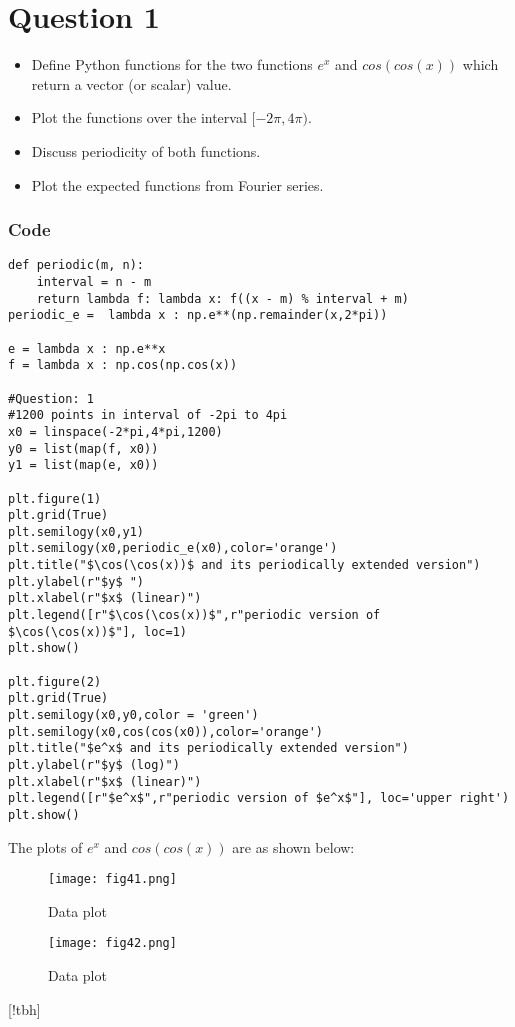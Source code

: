 \documentclass[11pt, a4paper, twoside]{article}
\begin{document}
\section{Question 1}
\begin{itemize}[label=-]
\item Define Python functions for the two functions $e^x$ and $cos(cos(x))$ which return a vector (or scalar) value.
\item Plot the functions over the interval $[-2\pi,4\pi)$.
\item Discuss periodicity of both functions.
\item Plot the expected functions from Fourier series.
\end{itemize}
\subsubsection{Code}
\begin{verbatim}
def periodic(m, n):
    interval = n - m
    return lambda f: lambda x: f((x - m) % interval + m)
periodic_e =  lambda x : np.e**(np.remainder(x,2*pi))

e = lambda x : np.e**x
f = lambda x : np.cos(np.cos(x))

#Question: 1
#1200 points in interval of -2pi to 4pi
x0 = linspace(-2*pi,4*pi,1200) 
y0 = list(map(f, x0))  
y1 = list(map(e, x0))

plt.figure(1)
plt.grid(True)
plt.semilogy(x0,y1)
plt.semilogy(x0,periodic_e(x0),color='orange')
plt.title("$\cos(\cos(x))$ and its periodically extended version")
plt.ylabel(r"$y$ ")
plt.xlabel(r"$x$ (linear)")
plt.legend([r"$\cos(\cos(x))$",r"periodic version of $\cos(\cos(x))$"], loc=1)
plt.show()

plt.figure(2)      
plt.grid(True)
plt.semilogy(x0,y0,color = 'green')
plt.semilogy(x0,cos(cos(x0)),color='orange')
plt.title("$e^x$ and its periodically extended version")
plt.ylabel(r"$y$ (log)")
plt.xlabel(r"$x$ (linear)")
plt.legend([r"$e^x$",r"periodic version of $e^x$"], loc='upper right')
plt.show()
\end{verbatim}
\newpage
The plots of $e^{x}$ and $cos(cos(x))$ are as shown below:
      \begin{figure}[!tbh]
   	\centering
   	\texttt{[image: fig41.png]}   
   	\caption{Data plot}
   	\label{fig:sample}
   \end{figure} 
\begin{figure}[!tbh]
   	\centering
   	\texttt{[image: fig42.png]}   
   	\caption{Data plot}
   	\label{fig:sample}
\end{figure}[!tbh]
\end{document}
